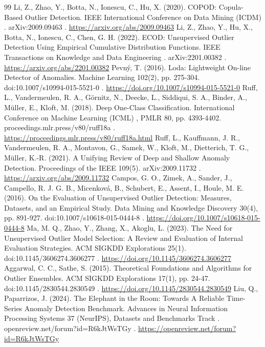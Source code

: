 \documentclass[3p,twocolumn]{elsarticle}
\begin{document}
\begin{thebibliography}{99}
\label{r11} Li, Z., Zhao, Y., Botta, N., Ionescu, C., Hu, X. (2020). COPOD: Copula-Based Outlier Detection. IEEE International Conference on Data Mining (ICDM) . arXiv:2009.09463 . \url{https://arxiv.org/abs/2009.09463}
\label{r12} Li, Z., Zhao, Y., Hu, X., Botta, N., Ionescu, C., Chen, G. H. (2022). ECOD: Unsupervised Outlier Detection Using Empirical Cumulative Distribution Functions. IEEE Transactions on Knowledge and Data Engineering . arXiv:2201.00382 . \url{https://arxiv.org/abs/2201.00382}
\label{r13} Pevný, T. (2016). Loda: Lightweight On-line Detector of Anomalies. Machine Learning 102(2), pp. 275-304. doi:10.1007/s10994-015-5521-0 . \url{https://doi.org/10.1007/s10994-015-5521-0}
\label{r14} Ruff, L., Vandermeulen, R. A., Görnitz, N., Deecke, L., Siddiqui, S. A., Binder, A., Müller, E., Kloft, M. (2018). Deep One-Class Classification. International Conference on Machine Learning (ICML) , PMLR 80, pp. 4393-4402. proceedings.mlr.press/v80/ruff18a . \url{https://proceedings.mlr.press/v80/ruff18a.html}
\label{r15} Ruff, L., Kauffmann, J. R., Vandermeulen, R. A., Montavon, G., Samek, W., Kloft, M., Dietterich, T. G., Müller, K.-R. (2021). A Unifying Review of Deep and Shallow Anomaly Detection. Proceedings of the IEEE 109(5). arXiv:2009.11732 . \url{https://arxiv.org/abs/2009.11732}
\label{r16} Campos, G. O., Zimek, A., Sander, J., Campello, R. J. G. B., Micenková, B., Schubert, E., Assent, I., Houle, M. E. (2016). On the Evaluation of Unsupervised Outlier Detection: Measures, Datasets, and an Empirical Study. Data Mining and Knowledge Discovery 30(4), pp. 891-927. doi:10.1007/s10618-015-0444-8 . \url{https://doi.org/10.1007/s10618-015-0444-8}
\label{r17} Ma, M. Q., Zhao, Y., Zhang, X., Akoglu, L. (2023). The Need for Unsupervised Outlier Model Selection: A Review and Evaluation of Internal Evaluation Strategies. ACM SIGKDD Explorations 25(1). doi:10.1145/3606274.3606277 . \url{https://doi.org/10.1145/3606274.3606277}
\label{r18} Aggarwal, C. C., Sathe, S. (2015). Theoretical Foundations and Algorithms for Outlier Ensembles. ACM SIGKDD Explorations 17(1), pp. 24-47. doi:10.1145/2830544.2830549 . \url{https://doi.org/10.1145/2830544.2830549}
\label{r19} Liu, Q., Paparrizos, J. (2024). The Elephant in the Room: Towards A Reliable Time-Series Anomaly Detection Benchmark. Advances in Neural Information Processing Systems 37 (NeurIPS), Datasets and Benchmarks Track . openreview.net/forum?id=R6kJtWsTGy . \url{https://openreview.net/forum?id=R6kJtWsTGy}

\end{thebibliography}
\end{document}

